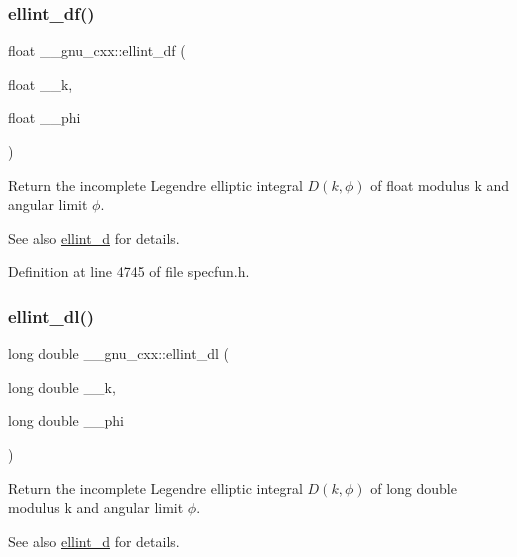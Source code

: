 \subsubsection{\texorpdfstring{ellint\+\_\+df()}{ellint\_df()}}
{\footnotesize\ttfamily float \+\_\+\+\_\+gnu\+\_\+cxx\+::ellint\+\_\+df (\begin{DoxyParamCaption}\item[{float}]{\+\_\+\+\_\+k,  }\item[{float}]{\+\_\+\+\_\+phi }\end{DoxyParamCaption})\hspace{0.3cm}{\ttfamily [inline]}}

Return the incomplete Legendre elliptic integral $ D(k, \phi) $ of {\ttfamily float} modulus {\ttfamily k} and angular limit $ \phi $.

\begin{DoxySeeAlso}{See also}
\hyperlink{group__mathsf__gnu_gad75103894786e6d7766bac4d8447b6cc}{ellint\+\_\+d} for details. 
\end{DoxySeeAlso}


Definition at line 4745 of file specfun.\+h.

\mbox{\label{group__mathsf__gnu_gaa34bcb8e316f2e8b2b2bf48cd89abd98}} 
\subsubsection{\texorpdfstring{ellint\+\_\+dl()}{ellint\_dl()}}
{\footnotesize\ttfamily long double \+\_\+\+\_\+gnu\+\_\+cxx\+::ellint\+\_\+dl (\begin{DoxyParamCaption}\item[{long double}]{\+\_\+\+\_\+k,  }\item[{long double}]{\+\_\+\+\_\+phi }\end{DoxyParamCaption})\hspace{0.3cm}{\ttfamily [inline]}}

Return the incomplete Legendre elliptic integral $ D(k, \phi) $ of {\ttfamily long double} modulus {\ttfamily k} and angular limit $ \phi $.

\begin{DoxySeeAlso}{See also}
\hyperlink{group__mathsf__gnu_gad75103894786e6d7766bac4d8447b6cc}{ellint\+\_\+d} for details. 
\end{DoxySeeAlso}


